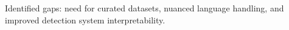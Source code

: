Identified gaps: need for curated datasets, nuanced language handling, and improved detection system interpretability.